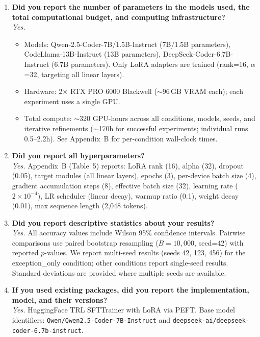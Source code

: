 \documentclass[11pt,a4paper]{article}
\begin{document}
\begin{enumerate}
\item \textbf{Did you report the number of parameters in the models used, the total computational budget, and computing infrastructure?} \\
\textit{Yes.}
\begin{itemize}
\item Models: Qwen-2.5-Coder-7B/1.5B-Instruct (7B/1.5B parameters), CodeLlama-13B-Instruct (13B parameters), DeepSeek-Coder-6.7B-Instruct (6.7B parameters). Only LoRA adapters are trained (rank=16, $\alpha$=32, targeting all linear layers).
\item Hardware: 2$\times$ RTX PRO 6000 Blackwell (${\sim}$96\,GB VRAM each); each experiment uses a single GPU.
\item Total compute: ${\sim}$320 GPU-hours across all conditions, models, seeds, and iterative refinements (${\sim}$170h for successful experiments; individual runs 0.5--2.2h). See Appendix~B for per-condition wall-clock times.
\end{itemize}

\item \textbf{Did you report all hyperparameters?} \\
\textit{Yes.} Appendix~B (Table~5) reports: LoRA rank (16), alpha (32), dropout (0.05), target modules (all linear layers), epochs (3), per-device batch size (4), gradient accumulation steps (8), effective batch size (32), learning rate ($2 \times 10^{-4}$), LR scheduler (linear decay), warmup ratio (0.1), weight decay (0.01), max sequence length (2,048 tokens).

\item \textbf{Did you report descriptive statistics about your results?} \\
\textit{Yes.} All accuracy values include Wilson 95\% confidence intervals. Pairwise comparisons use paired bootstrap resampling ($B{=}10{,}000$, seed=42) with reported $p$-values. We report multi-seed results (seeds 42, 123, 456) for the exception\_only condition; other conditions report single-seed results. Standard deviations are provided where multiple seeds are available.

\item \textbf{If you used existing packages, did you report the implementation, model, and their versions?} \\
\textit{Yes.} HuggingFace TRL SFTTrainer with LoRA via PEFT. Base model identifiers: \texttt{Qwen/Qwen2.5-Coder-7B-Instruct} and \texttt{deepseek-ai/deepseek-coder-6.7b-instruct}.
\end{enumerate}
\end{document}

